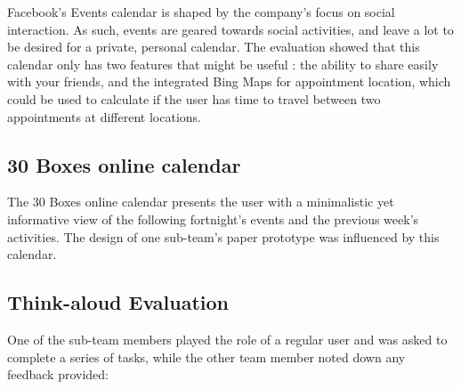 \documentclass{article}
\begin{document}
Facebook's Events calendar is shaped by the company's focus on social
interaction. As such, events are geared towards social activities, and
leave a lot to be desired for a private, personal calendar. The
evaluation showed that this calendar only has two features that
might be useful : the ability to share easily with your friends,
and the integrated Bing Maps for appointment location, which could be
used to calculate if the user has time to travel between two
appointments at different locations.


\subsection{30 Boxes online calendar}

The 30 Boxes online calendar presents the user with a minimalistic yet
informative view of the following fortnight's events and the previous
week's activities. The design of one sub-team's paper prototype was
influenced by this calendar. 

\subsection{Think-aloud Evaluation}

One of the sub-team members played the role of a regular user and was
asked to complete a series of tasks, while the other team member noted
down any feedback provided:
\end{document}

